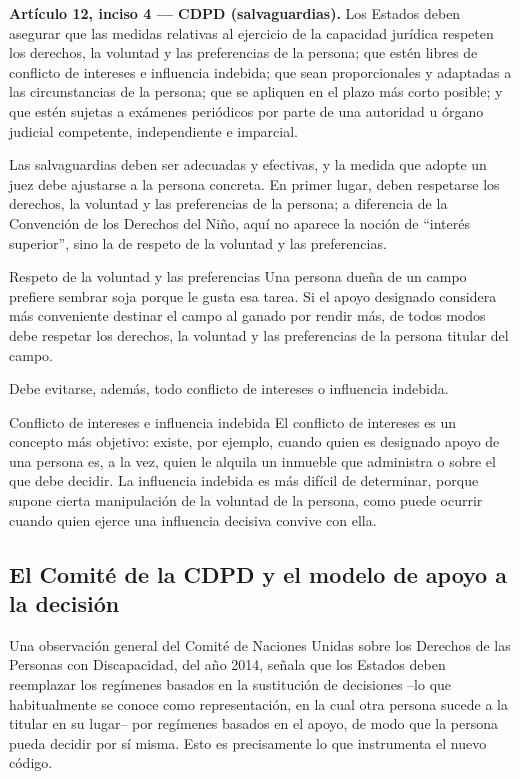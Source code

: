 \documentclass[12pt,oneside]{book}
\begin{document}
\begin{important}
\textbf{Artículo 12, inciso 4 --- CDPD (salvaguardias).} Los Estados deben asegurar que las medidas relativas al ejercicio de la capacidad jurídica respeten los derechos, la voluntad y las preferencias de la persona; que estén libres de conflicto de intereses e influencia indebida; que sean proporcionales y adaptadas a las circunstancias de la persona; que se apliquen en el plazo más corto posible; y que estén sujetas a exámenes periódicos por parte de una autoridad u órgano judicial competente, independiente e imparcial.
\end{important}

Las salvaguardias deben ser adecuadas y efectivas, y la medida que adopte un juez debe ajustarse a la persona concreta. En primer lugar, deben respetarse los derechos, la voluntad y las preferencias de la persona; a diferencia de la Convención de los Derechos del Niño, aquí no aparece la noción de ``interés superior'', sino la de respeto de la voluntad y las preferencias.

\begin{example}{Respeto de la voluntad y las preferencias}
Una persona dueña de un campo prefiere sembrar soja porque le gusta esa tarea. Si el apoyo designado considera más conveniente destinar el campo al ganado por rendir más, de todos modos debe respetar los derechos, la voluntad y las preferencias de la persona titular del campo.
\end{example}

Debe evitarse, además, todo conflicto de intereses o influencia indebida.

\begin{definition}{Conflicto de intereses e influencia indebida}
El conflicto de intereses es un concepto más objetivo: existe, por ejemplo, cuando quien es designado apoyo de una persona es, a la vez, quien le alquila un inmueble que administra o sobre el que debe decidir. La influencia indebida es más difícil de determinar, porque supone cierta manipulación de la voluntad de la persona, como puede ocurrir cuando quien ejerce una influencia decisiva convive con ella.
\end{definition}

\subsection{El Comité de la CDPD y el modelo de apoyo a la decisión}

Una observación general del Comité de Naciones Unidas sobre los Derechos de las Personas con Discapacidad, del año 2014, señala que los Estados deben reemplazar los regímenes basados en la sustitución de decisiones --lo que habitualmente se conoce como representación, en la cual otra persona sucede a la titular en su lugar-- por regímenes basados en el apoyo, de modo que la persona pueda decidir por sí misma. Esto es precisamente lo que instrumenta el nuevo código.
\end{document}
